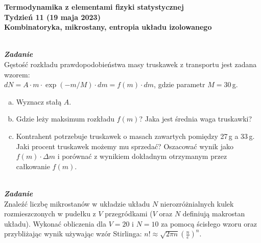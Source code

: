 \documentclass[11pt,a4paper]{article}
\newcounter{zadanie}\newcommand{\zadanie}[1][]{\addtocounter{zadanie}{1} ~\\  {\bf \emph{Zadanie \arabic{zadanie} #1 }} \\}
\begin{document}

\begin{centering}
\bf{\Large{Termodynamika z elementami fizyki statystycznej}}\\
Tydzień 11 (19 maja 2023)\\[0mm]
Kombinatoryka, mikrostany, entropia układu izolowanego\\
\end{centering} 
\vspace{5mm}

\zadanie
Gęstość rozkładu prawdopodobieństwa masy truskawek z transportu jest zadana wzorem:\\
$dN = A \cdot m \cdot \exp{(-m/M)} \cdot dm = f(m) \cdot dm$, gdzie parametr $M = 30\,$g.
\begin{enumerate}[a)]
\item Wyznacz stałą $A$.
\item Gdzie leży maksimum rozkładu $f(m)$? Jaka jest średnia waga truskawki?
\item Kontrahent potrzebuje truskawek o masach zawartych pomiędzy 27\,g a 33\,g. Jaki procent truskawek możemy mu sprzedać?
Oszacować wynik jako $f(m)\cdot \Delta m$ i porównać z wynikiem dokładnym otrzymanym przez całkowanie $f(m)$.
\end{enumerate}


\begin{figure}\vspace{0mm}
\end{figure}
\zadanie
Znaleźć liczbę mikrostanów w układzie układu $N$ nierozróżnialnych kulek rozmieszczonych w pudełku z $V$ przegródkami ($V$ oraz $N$ definiują makrostan układu). Wykonać obliczenia dla $V = 20$ i $N = 10$ za pomocą ścisłego wzoru oraz przybliżając wynik używając wzór Stirlinga: $\displaystyle n! \approx \sqrt{2 \pi n} \left(\frac{n}{e}\right)^n$.
\vspace{5mm}
\end{document}
